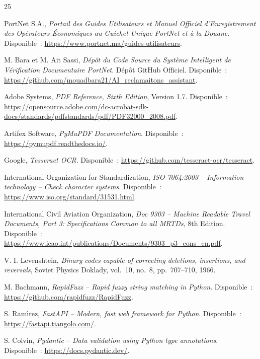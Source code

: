 \begin{thebibliography}{25}

PortNet S.A., \textit{Portail des Guides Utilisateurs et Manuel Officiel d'Enregistrement des Op\'{e}rateurs \'{E}conomiques au Guichet Unique PortNet et \`{a} la Douane}. Disponible~: \url{https://www.portnet.ma/guides-utilisateurs}.

M. Bara et M. Ait Sassi, \textit{D\'{e}p\^{o}t du Code Source du Syst\`{e}me Intelligent de V\'{e}rification Documentaire PortNet}. D\'{e}p\^{o}t GitHub Officiel. Disponible~: \url{https://github.com/mouadbara21/AI_reclamaitons_assistant}.

Adobe Systems, \textit{PDF Reference, Sixth Edition}, Version 1.7. Disponible~: \url{https://opensource.adobe.com/dc-acrobat-sdk-docs/standards/pdfstandards/pdf/PDF32000_2008.pdf}.

Artifex Software, \textit{PyMuPDF Documentation}. Disponible~: \url{https://pymupdf.readthedocs.io/}.

Google, \textit{Tesseract OCR}. Disponible~: \url{https://github.com/tesseract-ocr/tesseract}.

International Organization for Standardization, \textit{ISO 7064:2003 -- Information technology -- Check character systems}. Disponible~: \url{https://www.iso.org/standard/31531.html}.

International Civil Aviation Organization, \textit{Doc 9303 -- Machine Readable Travel Documents, Part 3: Specifications Common to all MRTDs}, 8th Edition. Disponible~: \url{https://www.icao.int/publications/Documents/9303_p3_cons_en.pdf}.

V. I. Levenshtein, \textit{Binary codes capable of correcting deletions, insertions, and reversals}, Soviet Physics Doklady, vol.~10, no.~8, pp.~707--710, 1966.

M. Bachmann, \textit{RapidFuzz -- Rapid fuzzy string matching in Python}. Disponible~: \url{https://github.com/rapidfuzz/RapidFuzz}.

S. Ram\'{\i}rez, \textit{FastAPI -- Modern, fast web framework for Python}. Disponible~: \url{https://fastapi.tiangolo.com/}.

S. Colvin, \textit{Pydantic -- Data validation using Python type annotations}. Disponible~: \url{https://docs.pydantic.dev/}.


\end{thebibliography}

